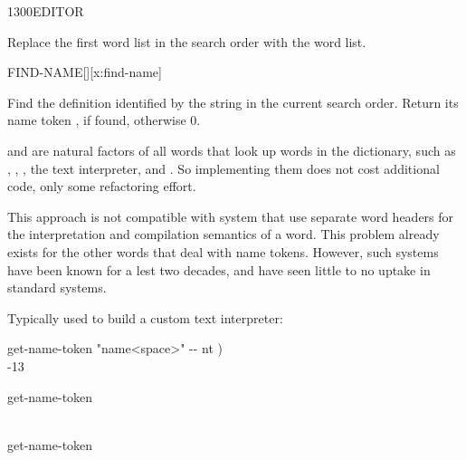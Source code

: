 \begin{worddef}{1300}{EDITOR}
\item \stack{}{}

	Replace the first word list in the search order with the
	 word list.

\end{worddef}


\begin{worddef}{}{FIND-NAME}[][x:find-name]
\item {}

	Find the definition identified by the string  in the current
	search order.  Return its name token , if found, otherwise 0.


	\begin{rationale}
		 and  are natural factors of all words
		that look up words in the dictionary, such as , ,
		, the text interpreter, and .
		So implementing them does not cost additional code, only some refactoring
		effort.

		This approach is not compatible with system that use separate word headers
		for	the interpretation and compilation semantics of a word.  This problem
		already exists for the other words that deal with name tokens.  However,
		such systems have been known for a lest two decades, and have seen little
		to no uptake in standard systems.

		Typically used to build a custom text interpreter:

		\ttfamily
		\word{:} get-name-token  "name<space>" -{}- nt ) \\
		\tab[1]	    -13  \\
		\word{;}

		\word{:}  get-name-token   \word{;}

		\word{:}  \\
		\tab[1]	get-name-token     \\
		\word{;} 


\end{rationale}
\end{worddef}
